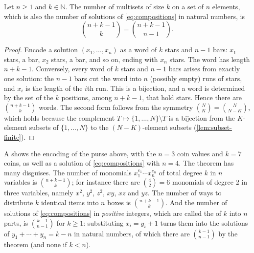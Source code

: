 \begin{theorem}
\label{thm:multisets}
Let $n\ge1$ and $k\in\mathbb N$. The number of multisets of size $k$ on a set of $n$ elements, which is also the number of solutions of \eqref{eq:compositions} in natural numbers, is
\[
\binom{n+k-1}{k}=\binom{n+k-1}{n-1}.
\]
\end{theorem}

\begin{proof}
Encode a solution $(x_1,\ldots,x_n)$ as a word of $k$ stars and $n-1$ bars: $x_1$ stars, a bar, $x_2$ stars, a bar, and so on, ending with $x_n$ stars. The word has length $n+k-1$. Conversely, every word of $k$ stars and $n-1$ bars arises from exactly one solution: the $n-1$ bars cut the word into $n$ (possibly empty) runs of stars, and $x_i$ is the length of the $i$th run. This is a bijection, and a word is determined by the set of the $k$ positions, among $n+k-1$, that hold stars. Hence there are $\binom{n+k-1}{k}$ words. The second form follows from the symmetry $\binom NK=\binom N{N-K}$, which holds because the complement $T\mapsto\{1,\ldots,N\}\setminus T$ is a bijection from the $K$-element subsets of $\{1,\ldots,N\}$ to the $(N-K)$-element subsets (\cref{lem:subset-finite}).
\end{proof}

A shows the encoding of the purse above, with the $n=3$ coin values and $k=7$ coins, as well as a solution of \eqref{eq:compositions} with $n=4$. The theorem has many disguises. The number of monomials $x_1^{e_1}\cdots x_n^{e_n}$ of total degree $k$ in $n$ variables is $\binom{n+k-1}{k}$; for instance there are $\binom42=6$ monomials of degree $2$ in three variables, namely $x^2$, $y^2$, $z^2$, $xy$, $xz$ and $yz$. The number of ways to distribute $k$ identical items into $n$ boxes is $\binom{n+k-1}{k}$. And the number of solutions of \eqref{eq:compositions} in \emph{positive} integers, which are called the  of $k$ into $n$ parts, is $\binom{k-1}{n-1}$ for $k\ge1$: substituting $x_i=y_i+1$ turns them into the solutions of $y_1+\cdots+y_n=k-n$ in natural numbers, of which there are $\binom{k-1}{n-1}$ by the theorem (and none if $k<n$).


